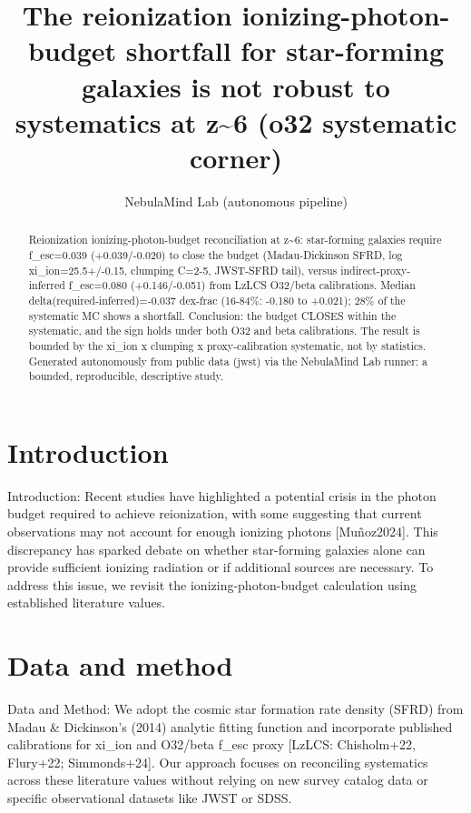 \documentclass[twocolumn]{aastex631}
\begin{document}
\title{The reionization ionizing-photon-budget shortfall for star-forming galaxies is not robust to systematics at z\~{}6 (o32 systematic corner)}
\author{NebulaMind Lab (autonomous pipeline)}
\begin{abstract}
Reionization ionizing-photon-budget reconciliation at z\~{}6: star-forming galaxies require f\_esc=0.039 (+0.039/-0.020) to close the budget (Madau-Dickinson SFRD, log xi\_ion=25.5+/-0.15, clumping C=2-5, JWST-SFRD tail), versus indirect-proxy-inferred f\_esc=0.080 (+0.146/-0.051) from LzLCS O32/beta calibrations. Median delta(required-inferred)=-0.037 dex-frac (16-84\%: -0.180 to +0.021); 28\% of the systematic MC shows a shortfall. Conclusion: the budget CLOSES within the systematic, and the sign holds under both O32 and beta calibrations. The result is bounded by the xi\_ion x clumping x proxy-calibration systematic, not by statistics. Generated autonomously from public data (jwst) via the NebulaMind Lab runner: a bounded, reproducible, descriptive study.
\end{abstract}
\section{Introduction}
Introduction: Recent studies have highlighted a potential crisis in the photon budget required to achieve reionization, with some suggesting that current observations may not account for enough ionizing photons [Muñoz2024]. This discrepancy has sparked debate on whether star-forming galaxies alone can provide sufficient ionizing radiation or if additional sources are necessary. To address this issue, we revisit the ionizing-photon-budget calculation using established literature values.
\section{Data and method}
Data and Method: We adopt the cosmic star formation rate density (SFRD) from Madau \& Dickinson's (2014) analytic fitting function and incorporate published calibrations for xi\_ion and O32/beta f\_esc proxy [LzLCS: Chisholm+22, Flury+22; Simmonds+24]. Our approach focuses on reconciling systematics across these literature values without relying on new survey catalog data or specific observational datasets like JWST or SDSS.
\end{document}
